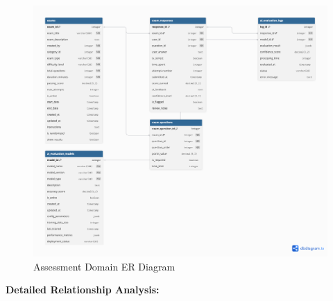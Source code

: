 \documentclass[12pt,a4paper,oneside]{book}
\begin{document}
\begin{figure}[H]
    \centering
    \includegraphics[width=1\textwidth]{assets/ER/Figure4.9.png}
    \caption{Assessment Domain ER Diagram}
    \label{fig:assessment_er}
\end{figure}

\textbf{Detailed Relationship Analysis:}
\end{document}
